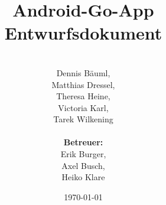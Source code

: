 \documentclass[parskip=full]{scrartcl}
\begin{document}
\title{Android-Go-App Entwurfsdokument}
\author{\\Dennis Bäuml,\\ Matthias Dressel,\\ Theresa Heine,\\ Victoria Karl, \\ Tarek Wilkening\\
	\\ \textbf{Betreuer:} \\Erik Burger, \\Axel Busch, \\Heiko Klare \\}
	
\date{\today}
\maketitle
\newpage
\tableofcontents
\newpage


\newpage

\newpage





\end{document}
